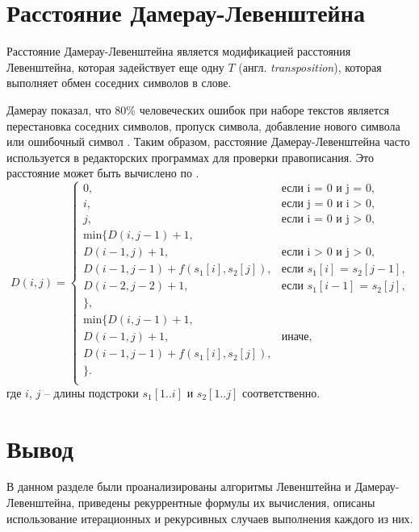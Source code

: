 \section{Расстояние Дамерау-Левенштейна}
Расстояние Дамерау-Левенштейна является модификацией расстояния Левенштейна, которая задействует еще одну  $T$ (англ. \textit{transposition}), которая выполняет обмен соседних символов в слове.

Дамерау показал, что 80\% человеческих ошибок при наборе текстов является перестановка соседних символов, пропуск символа, добавление нового символа или ошибочный символ \cite{damerau_levenshtein}. Таким образом, расстояние Дамерау-Левенштейна часто используется в редакторских программах для проверки правописания.
Это расстояние может быть вычислено по .
\begin{equation}
	\label{eq:damerau_levenshtein}
	D(i, j) = 
	\begin{cases}
		0, &\text{если i = 0 и j = 0,}\\
		i, &\text{если j = 0 и i > 0,}\\
		j, &\text{если i = 0 и j > 0,}\\
		\text{min} \lbrace
		D(i, j - 1) + 1,\\
		D(i - 1, j) + 1, &\text{если i > 0 и j > 0,} \\
		D(i - 1, j - 1) + f(s_{1}[i], s_{2}[j]), &\text{если $s_1[i]$ = $s_2[j - 1]$,}\\
		D(i - 2, j - 2) + 1,  &\text{если $s_1[i - 1]$ = $s_2[j]$,}\\
		\rbrace, \\
		\text{min} \lbrace
		D(i, j - 1) + 1,\\
		D(i - 1, j) + 1, &\text{иначе,}\\
		D(i - 1, j - 1) + f(s_{1}[i], s_{2}[j]), \\
		\rbrace.\\
	\end{cases}
\end{equation}
где $i$, $j$ -- длины подстроки $s_{1}[1..i]$ и $s_{2}[1..j]$ соответственно.

\section*{Вывод}
В данном разделе были проанализированы алгоритмы Левенштейна и Дамерау-Левенштейна, приведены рекуррентные формулы их вычисления, описаны использование итерационных и рекурсивных случаев выполнения каждого из них.